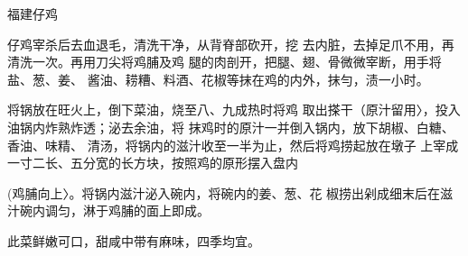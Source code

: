 \begin{recipe}{福建仔鸡}

\ingredients


\cooking

\step 	仔鸡宰杀后去血退毛，清洗干净，从背脊部砍开，挖 去内脏，去掉足爪不用，再清洗一次。再用刀尖将鸡脯及鸡 腿的肉剖开，把腿、翅、骨微微宰断，用手将盐、葱、姜、 酱油、耢糟、料酒、花椒等抹在鸡的内外，抹勻，渍一小时。

\step 	将锅放在旺火上，倒下菜油，烧至八、九成热时将鸡 取出搽干（原汁留用〉，投入油锅内炸熟炸透；泌去余油，将 抹鸡时的原汁一并倒入锅内，放下胡椒、白糖、香油、味精、 清汤，将锅内的滋汁收至一半为止，然后将鸡捞起放在墩子 上宰成一寸二长、五分宽的长方块，按照鸡的原形摆入盘内

(鸡脯向上〉。将锅内滋汁泌入碗内，将碗内的姜、葱、花 椒捞出剁成细末后在滋汁碗内调匀，淋于鸡脯的面上即成。

\notes

此菜鲜嫩可口，甜咸中带有麻味，四季均宜。

\end{recipe}

